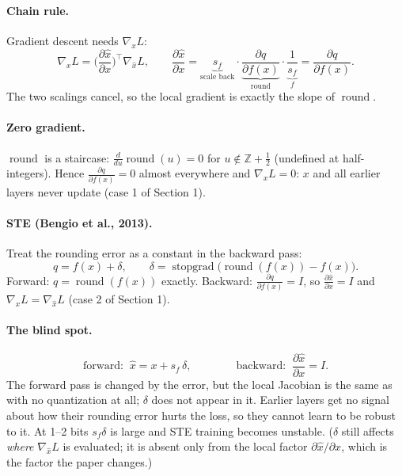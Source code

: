 \documentclass[11pt]{article}
\begin{document}
\paragraph{Chain rule.} Gradient descent needs $\nabla_x L$:
\[
\nabla_x L=\Big(\frac{\partial \hat x}{\partial x}\Big)^{\!\top}\nabla_{\hat x}L,
\qquad
\frac{\partial \hat x}{\partial x}
=\underbrace{s_f}_{\text{scale back}}\cdot\underbrace{\frac{\partial q}{\partial f(x)}}_{\text{round}}\cdot\underbrace{\frac{1}{s_f}}_{f}
=\frac{\partial q}{\partial f(x)} .
\]
The two scalings cancel, so the local gradient is exactly the slope of $\operatorname{round}$.

\paragraph{Zero gradient.} $\operatorname{round}$ is a staircase: $\frac{d}{du}\operatorname{round}(u)=0$ for $u\notin\mathbb Z+\frac12$ (undefined at half-integers). Hence $\frac{\partial q}{\partial f(x)}=0$ almost everywhere and $\nabla_x L=0$: $x$ and all earlier layers never update (case 1 of Section 1).

\paragraph{STE (Bengio et al., 2013).} Treat the rounding error as a constant in the backward pass:
\[
q=f(x)+\delta,\qquad \delta=\operatorname{stopgrad}\big(\operatorname{round}(f(x))-f(x)\big).
\]
Forward: $q=\operatorname{round}(f(x))$ exactly. Backward: $\frac{\partial q}{\partial f(x)}=I$, so $\frac{\partial \hat x}{\partial x}=I$ and $\nabla_x L=\nabla_{\hat x}L$ (case 2 of Section 1).

\paragraph{The blind spot.}
\[
\text{forward: }\ \hat x=x+s_f\,\delta,\qquad\qquad \text{backward: }\ \frac{\partial \hat x}{\partial x}=I .
\]
The forward pass is changed by the error, but the local Jacobian is the same as with no quantization at all; $\delta$ does not appear in it. Earlier layers get no signal about how their rounding error hurts the loss, so they cannot learn to be robust to it. At 1--2 bits $s_f\delta$ is large and STE training becomes unstable. ($\delta$ still affects \emph{where} $\nabla_{\hat x}L$ is evaluated; it is absent only from the local factor $\partial\hat x/\partial x$, which is the factor the paper changes.)
\end{document}

